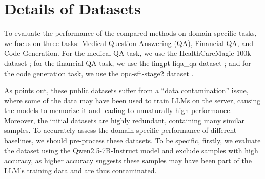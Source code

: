 \clearpage
\newpage
\appendix

\section{Details of Datasets}
\label{app:data_details}

\begin{table*}[!b]
    \centering
    \def\arraystretch{1.7} %
    \vspace{-0.5em}
    \caption{The dataset statistics of the medical QA, financial QA and code generation task. All train set is hold by the client and is regard as the private data. 
    The size of sampling synthetic data is two times of the size of the private train set.}
    \label{tbl:statistics}
\end{table*}


To evaluate the performance of the compared methods on domain-specific tasks, we focus on three tasks: Medical Question-Answering (QA), Financial QA, and Code Generation. 
For the medical QA task, we use the HealthCareMagic-100k dataset \citep{li2023chatdoctor}; for the financial QA task, we use the fingpt-fiqa\_qa dataset \citep{zhang2023instructfingpt}; and for the code generation task, we use the opc-sft-stage2 dataset \citep{Huang2024OpenCoderTO}.

As \citet{dong2024gene} points out, these public datasets suffer from a ``data contamination'' issue, where some of the data may have been used to train LLMs on the server, causing the models to memorize it and leading to unnaturally high performance.
Moreover, the initial datasets are highly redundant, containing many similar samples. 
To accurately assess the domain-specific performance of different baselines, we should pre-process these datasets. 
To be specific, firstly, we evaluate the dataset using the Qwen2.5-7B-Instruct model \cite{yang2024qwen2} and exclude samples with high accuracy, as higher accuracy suggests these samples may have been part of the LLM's training data and are thus contaminated.

